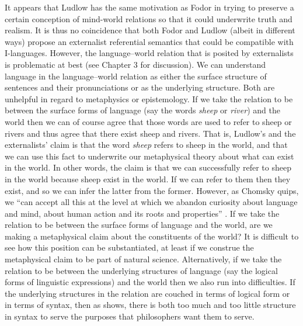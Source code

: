 It appears that Ludlow has the same motivation as Fodor in trying to preserve a certain conception of mind-world relations so that it could underwrite truth and realism. It is thus no coincidence that both Fodor and Ludlow (albeit in different ways) propose an externalist referential semantics that could be compatible with I-languages. However, the language--world relation that is posited by externalists is problematic at best (see Chapter 3 for discussion). We can understand language in the language--world relation as either the surface structure of sentences and their pronunciations or as the underlying structure. Both are unhelpful in regard to metaphysics or epistemology. If we take the relation to be between the surface forms of language (say the words \textit{sheep} or \textit{river}) and the world then we can of course agree that those words are used to refer to sheep or rivers and thus agree that there exist sheep and rivers. That is, Ludlow’s and the externalists’ claim is that the word \textit{sheep} refers to sheep in the world, and that we can use this fact to underwrite our metaphysical theory about what can exist in the world. In other words, the claim is that we can successfully refer to sheep in the world because sheep exist in the world. If we can refer to them then they exist, and so we can infer the latter from the former. However, as Chomsky quips, we “can accept all this at the level at which we abandon curiosity about language and mind, about human action and its roots and properties” \citep[290]{Chomsky2003a}. If we take the relation to be between the surface forms of language and the world, are we making a metaphysical claim about the constituents of the world? It is difficult to see how this position can be substantiated, at least if we construe the metaphysical claim to be part of natural science. Alternatively, if we take the relation to be between the underlying structures of language (say the logical forms of linguistic expressions) and the world then we also run into difficulties. If the underlying structures in the relation are couched in terms of logical form or in terms of syntax, then as \citet{Collins2007} shows, there is both too much and too little structure in syntax to serve the purposes that philosophers want them to serve. 

